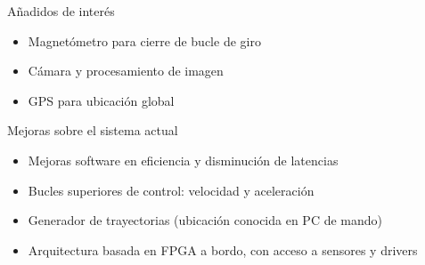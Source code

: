 \documentclass[a4,landscpae]{seminar}
\begin{document}
\begin{hslide}

A\~nadidos de inter\'es
\begin{itemize}
	\item Magnet\'ometro para cierre de bucle de giro
	\item C\'amara y procesamiento de imagen
	\item GPS para ubicaci\'on global
\end{itemize}
Mejoras sobre el sistema actual
\begin{itemize}
	\item Mejoras software en eficiencia y disminuci\'on de latencias
	\item Bucles superiores de control: velocidad y aceleraci\'on
	\item Generador de trayectorias (ubicaci\'on conocida en PC de mando)
	\item Arquitectura basada en FPGA a bordo, con acceso a sensores y drivers
\end{itemize}


\end{hslide}
\end{document}
